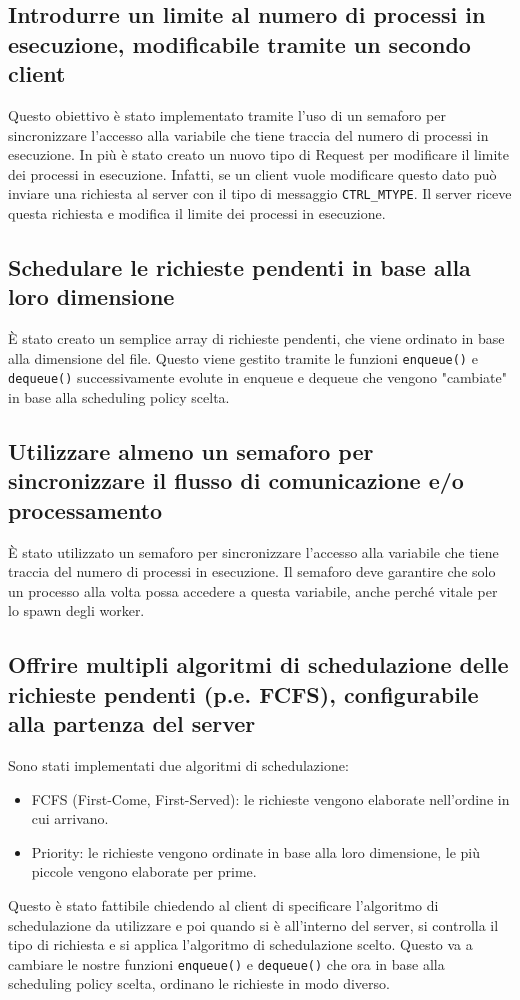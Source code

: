 \documentclass[a4paper]{article}
\begin{document}
\subsection{Introdurre un limite al numero di processi in esecuzione, modificabile tramite un secondo client}

Questo obiettivo è stato implementato tramite l'uso di un semaforo per sincronizzare
l'accesso alla variabile che tiene traccia del numero di processi in esecuzione.
In più è stato creato un nuovo tipo di Request per modificare il limite dei processi in esecuzione.
Infatti, se un client vuole modificare questo dato può inviare una richiesta al server con il tipo di messaggio \texttt{CTRL\_MTYPE}.
Il server riceve questa richiesta e modifica il limite dei processi in esecuzione.

\subsection{Schedulare le richieste pendenti in base alla loro dimensione}

È stato creato un semplice array di richieste pendenti, che viene ordinato in base alla dimensione del file.
Questo viene gestito tramite le funzioni \texttt{enqueue()} e \texttt{dequeue()} successivamente
evolute in enqueue e dequeue che vengono "cambiate" in base alla scheduling policy scelta.

\subsection{Utilizzare almeno un semaforo per sincronizzare il flusso di comunicazione e/o processamento}

È stato utilizzato un semaforo per sincronizzare l'accesso alla variabile che tiene traccia del numero di processi in esecuzione.
Il semaforo deve garantire che solo un processo alla volta possa accedere a questa variabile, anche perché vitale
per lo spawn degli worker.

\subsection{Offrire multipli algoritmi di schedulazione delle richieste pendenti (p.e. FCFS), configurabile alla partenza del server}

Sono stati implementati due algoritmi di schedulazione:
\begin{itemize}
    \item FCFS (First-Come, First-Served): le richieste vengono elaborate nell'ordine in cui arrivano.
    \item Priority: le richieste vengono ordinate in base alla loro dimensione, le più piccole vengono elaborate per prime.
\end{itemize}
\noindent
Questo è stato fattibile chiedendo al client di specificare l'algoritmo di schedulazione da utilizzare e poi
quando si è all'interno del server, si controlla il tipo di richiesta e si applica l'algoritmo di schedulazione scelto.
Questo va a cambiare le nostre funzioni \texttt{enqueue()} e \texttt{dequeue()} che ora in base alla scheduling policy
scelta, ordinano le richieste in modo diverso.
\end{document}
